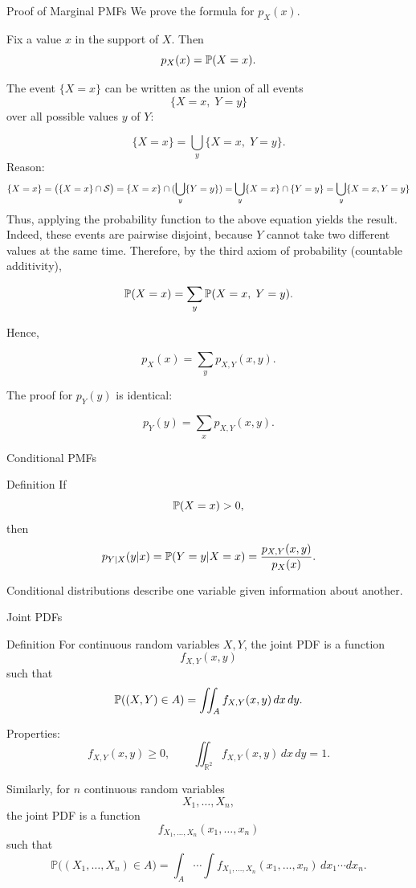 \begin{frame}{Proof of Marginal PMFs}
We prove the formula for $p_X(x)$.


Fix a value $x$ in the support of $X$. Then
\[
p_X(x)
=
\mathbb{P}(X=x).
\]

The event $\{X=x\}$ can be written as the union of all events
\[
\{X=x,\;Y=y\}
\]
over all possible values $y$ of $Y$:

\[
\{X=x\}
=
\bigcup_y \{X=x,\;Y=y\}.
\]
Reason:
\begin{equation*}
    \{X = x \} = \big ( \{X=x\} \cap\mathcal{S} \big )= \{ X=x\} \cap ( \bigcup_{y}\{ Y=y\}) =  \bigcup_y \{ X=x\}\cap \{Y=y \}  =  \bigcup_y \{X=x, Y=y \}
\end{equation*}
Thus, applying the probability function to the above equation yields the result. Indeed, these events are pairwise disjoint, because $Y$ cannot take two different
values at the same time. Therefore, by the third axiom of probability (countable additivity),

\[
\mathbb{P}(X=x)
=
\sum_y \mathbb{P}(X=x,\;Y=y).
\]

Hence,

\[
\boxed{
p_X(x)
=
\sum_y p_{X,Y}(x,y).
}
\]

The proof for $p_Y(y)$ is identical:

\[
\boxed{
p_Y(y)
=
\sum_x p_{X,Y}(x,y).
}
\]
\end{frame}











\begin{frame}{Conditional PMFs}
\begin{keybox}{Definition}
If
\[
\mathbb{P}(X=x)>0,
\]
then
\[
{
p_{Y|X}(y|x)
=
\mathbb{P}(Y=y|X=x)
=
\frac{
p_{X,Y}(x,y)
}{
p_X(x)
}.
}
\]
\end{keybox}

\vspace{0.25cm}

Conditional distributions describe one variable given information about another.
\end{frame}
\begin{frame}{Joint PDFs}
\begin{keybox}{Definition}
For continuous random variables \(X,Y\), the joint PDF is a function
\[
f_{X,Y}(x,y)
\]
such that
\[
\mathbb{P}((X,Y)\in A)
=
\iint_A f_{X,Y}(x,y)\,dx\,dy.
\]
\end{keybox}

 

Properties:
\[
f_{X,Y}(x,y)\ge0,
\qquad
\iint_{\mathbb{R}^2} f_{X,Y}(x,y)\,dx\,dy=1.
\]

 

Similarly, for $n$ continuous random variables
\[
X_1,\dots,X_n,
\]
the joint PDF is a function
\[
f_{X_1,\dots,X_n}(x_1,\dots,x_n)
\]
such that
\[
\mathbb{P}\big((X_1,\dots,X_n)\in A\big)
=
\int_A \cdots \int
f_{X_1,\dots,X_n}(x_1,\dots,x_n)
\,dx_1\cdots dx_n.
\]
\end{frame}


